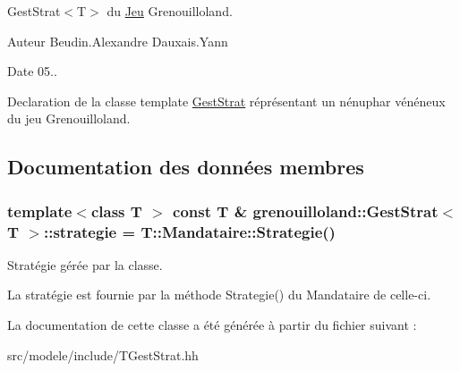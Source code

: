 Gest\-Strat$<$\-T$>$ du \hyperlink{classgrenouilloland_1_1Jeu}{Jeu} Grenouilloland. 

\begin{DoxyAuthor}{Auteur}
Beudin.\-Alexandre Dauxais.\-Yann 
\end{DoxyAuthor}
\begin{DoxyDate}{Date}
05..
\end{DoxyDate}
Declaration de la classe template \hyperlink{classgrenouilloland_1_1GestStrat}{Gest\-Strat} réprésentant un nénuphar vénéneux du jeu Grenouilloland. 

\subsection{Documentation des données membres}
\hypertarget{classgrenouilloland_1_1GestStrat_afa2982ce94250faed383990231c491bf}{
\subsubsection[{strategie}]{\setlength{\rightskip}{0pt plus 5cm}template$<$class T $>$ const T \& {\bf grenouilloland\-::\-Gest\-Strat}$<$ T $>$\-::strategie = T\-::\-Mandataire\-::\-Strategie()\hspace{0.3cm}{\ttfamily [static]}}}\label{classgrenouilloland_1_1GestStrat_afa2982ce94250faed383990231c491bf}
Stratégie gérée par la classe.

La stratégie est fournie par la méthode Strategie() du Mandataire de celle-\/ci. 

La documentation de cette classe a été générée à partir du fichier suivant \-:\begin{DoxyCompactItemize}
\item 
src/modele/include/T\-Gest\-Strat.\-hh\end{DoxyCompactItemize}
